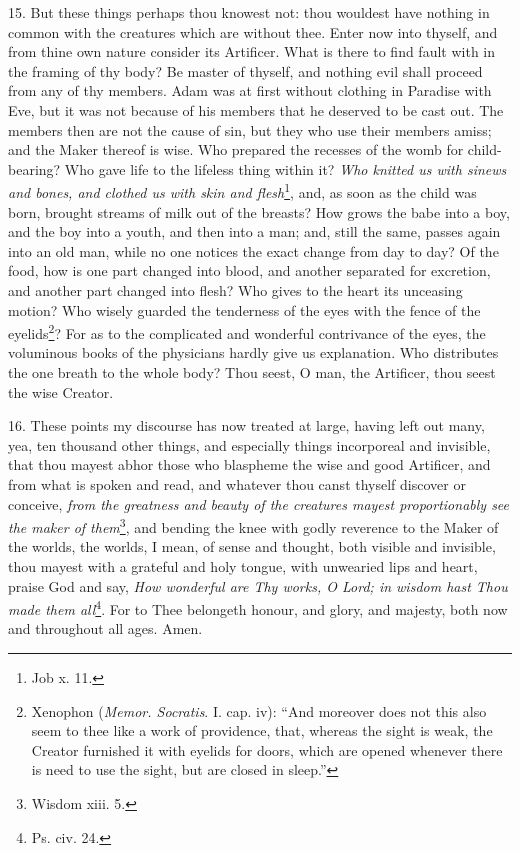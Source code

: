 15. But these things perhaps thou knowest not: thou wouldest have nothing in common with the creatures which are without thee. Enter now into thyself, and from thine own nature consider its Artificer. What is there to find fault with in the framing of thy body? Be master of thyself, and nothing evil shall proceed from any of thy members. Adam was at first without clothing in Paradise with Eve, but it was not because of his members that he deserved to be cast out. The members then are not the cause of sin, but they who use their members amiss; and the Maker thereof is wise. Who prepared the recesses of the womb for child-bearing? Who gave life to the lifeless thing within it? \emph{Who knitted us with sinews and bones, and clothed us with skin and flesh}\footnote{Job x. 11.}, and, as soon as the child was born, brought streams of milk out of the breasts? How grows the babe into a boy, and the boy into a youth, and then into a man; and, still the same, passes again into an old man, while no one notices the exact change from day to day? Of the food, how is one part changed into blood, and another separated for excretion, and another part changed into flesh? Who gives to the heart its unceasing motion? Who wisely guarded the tenderness of the eyes with the fence of the eyelids\footnote{Xenophon (\emph{Memor. Socratis}. I. cap. iv): “And moreover does not this also seem to thee like a work of providence, that, whereas the sight is weak, the Creator furnished it with eyelids for doors, which are opened whenever there is need to use the sight, but are closed in sleep.”}? For as to the complicated and wonderful contrivance of the eyes, the voluminous books of the physicians hardly give us explanation. Who distributes the one breath to the whole body? Thou seest, O man, the Artificer, thou seest the wise Creator.

16. These points my discourse has now treated at large, having left out many, yea, ten thousand other things, and especially things incorporeal and invisible, that thou mayest abhor those who blaspheme the wise and good Artificer, and from what is spoken and read, and whatever thou canst thyself discover or conceive, \emph{from the greatness and beauty of the creatures mayest proportionably see the maker of them}\footnote{Wisdom xiii. 5.}, and bending the knee with godly reverence to the Maker of the worlds, the worlds, I mean, of sense and thought, both visible and invisible, thou mayest with a grateful and holy tongue, with unwearied lips and heart, praise God and say, \emph{How wonderful are Thy works, O Lord; in wisdom hast Thou made them all}\footnote{Ps. civ. 24.}. For to Thee belongeth honour, and glory, and majesty, both now and throughout all ages. Amen.

